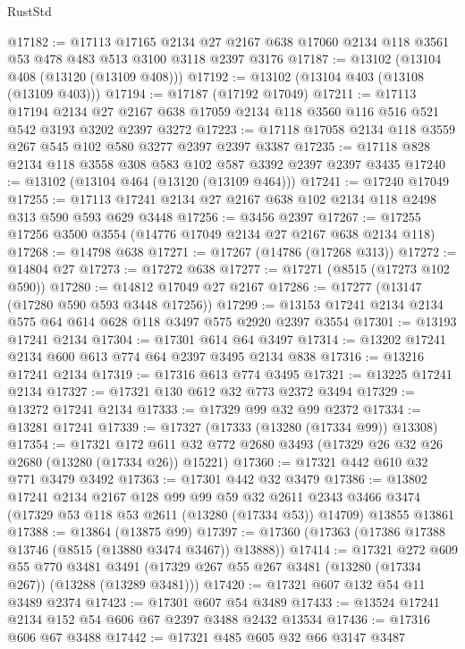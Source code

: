\begin{lexlean}{RustStd}
\begin{coremodule}
@17182 := @17113
    @17165
    @2134
    @27
    @2167
    @638
    @17060
    @2134
    @118
    @3561
    @53
    @478
    @483
    @513
    @3100
    @3118
    @2397
    @3176
@17187 := @13102 (@13104 @408 (@13120 (@13109 @408)))
@17192 := @13102 (@13104 @403 (@13108 (@13109 @403)))
@17194 := @17187 (@17192 @17049)
@17211 := @17113
    @17194
    @2134
    @27
    @2167
    @638
    @17059
    @2134
    @118
    @3560
    @116
    @516
    @521
    @542
    @3193
    @3202
    @2397
    @3272
@17223 := @17118 @17058 @2134 @118 @3559 @267 @545 @102 @580 @3277 @2397 @2397 @3387
@17235 := @17118 @828 @2134 @118 @3558 @308 @583 @102 @587 @3392 @2397 @2397 @3435
@17240 := @13102 (@13104 @464 (@13120 (@13109 @464)))
@17241 := @17240 @17049
@17255 := @17113 @17241 @2134 @27 @2167 @638 @102 @2134 @118 @2498 @313 @590 @593 @629 @3448
@17256 := @3456 @2397
@17267 := @17255 @17256 @3500 @3554 (@14776 @17049 @2134 @27 @2167 @638 @2134 @118)
@17268 := @14798 @638
@17271 := @17267 (@14786 (@17268 @313))
@17272 := @14804 @27
@17273 := @17272 @638
@17277 := @17271 (@8515 (@17273 @102 @590))
@17280 := @14812 @17049 @27 @2167
@17286 := @17277 (@13147 (@17280 @590 @593 @3448 @17256))
@17299 := @13153 @17241 @2134 @2134 @575 @64 @614 @628 @118 @3497 @575 @2920 @2397 @3554
@17301 := @13193 @17241 @2134
@17304 := @17301 @614 @64 @3497
@17314 := @13202 @17241 @2134 @600 @613 @774 @64 @2397 @3495 @2134 @838
@17316 := @13216 @17241 @2134
@17319 := @17316 @613 @774 @3495
@17321 := @13225 @17241 @2134
@17327 := @17321 @130 @612 @32 @773 @2372 @3494
@17329 := @13272 @17241 @2134
@17333 := @17329 @99 @32 @99 @2372
@17334 := @13281 @17241
@17339 := @17327 (@17333 (@13280 (@17334 @99)) @13308)
@17354 := @17321
    @172
    @611
    @32
    @772
    @2680
    @3493
    (@17329 @26 @32 @26 @2680 (@13280 (@17334 @26)) @15221)
@17360 := @17321 @442 @610 @32 @771 @3479 @3492
@17363 := @17301 @442 @32 @3479
@17386 := @13802
    @17241
    @2134
    @2167
    @128
    @99
    @99
    @59
    @32
    @2611
    @2343
    @3466
    @3474
    (@17329 @53 @118 @53 @2611 (@13280 (@17334 @53)) @14709)
    @13855
    @13861
@17388 := @13864 (@13875 @99)
@17397 := @17360 (@17363 (@17386 @17388 @13746 (@8515 (@13880 @3474 @3467)) @13888))
@17414 := @17321
    @272
    @609
    @55
    @770
    @3481
    @3491
    (@17329 @267 @55 @267 @3481 (@13280 (@17334 @267)) (@13288 (@13289 @3481)))
@17420 := @17321 @607 @132 @54 @11 @3489 @2374
@17423 := @17301 @607 @54 @3489
@17433 := @13524 @17241 @2134 @152 @54 @606 @67 @2397 @3488 @2432 @13534
@17436 := @17316 @606 @67 @3488
@17442 := @17321 @485 @605 @32 @66 @3147 @3487

\end{coremodule}
\end{lexlean}
